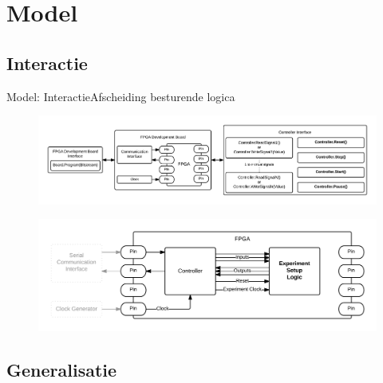 \documentclass{beamer}
\begin{document}
\section{Model}

\subsection{Interactie}
\begin{frame}{Model: Interactie}{Afscheiding besturende logica}
\begin{figure}[h]
    \centering
    \includegraphics[width=\textwidth]{img/overview-control}
\end{figure}
\begin{figure}[h]
    \centering
    \includegraphics[width=\textwidth]{img/fpga-control}
\end{figure}
\end{frame}

\subsection{Generalisatie}
\end{document}

